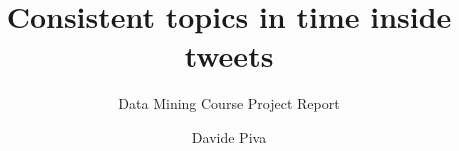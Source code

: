 \documentclass[sigconf,edbt]{acmart-edbt2021}
\begin{document}
\title{Consistent topics in time inside tweets}
\subtitle{Data Mining Course Project Report}
  

\author{Davide Piva}


\maketitle





\end{document}
